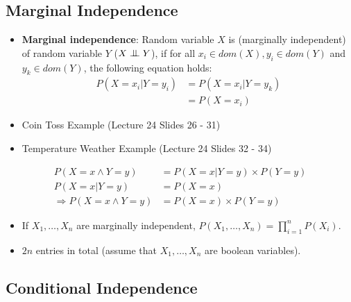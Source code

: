 \documentclass{article}
\newcommand{\bigCI}{\mathrel{\text{\scalebox{1.07}{$\perp\mkern-10mu\perp$}}}}
\begin{document}
\subsection{Marginal Independence}

\begin{itemize}
    \item \textbf{Marginal independence}: Random variable $X$ is (marginally independent) of random variable $Y$ ($X \bigCI Y$), if for all $x_i \in dom(X), y_i \in dom(Y)$ and $y_k \in dom(Y)$, the following equation holds:
    \begin{align*}
        P(X = x_i|Y = y_i) &=  P(X = x_i|Y = y_k) \\
        &= P(X = x_i)
    \end{align*}
    \item Coin Toss Example (Lecture 24 Slides 26 - 31)
    \item Temperature Weather Example (Lecture 24 Slides 32 - 34)
\end{itemize}

\begin{align*}
    P(X = x \wedge Y = y) &= P(X = x | Y = y) \times P(Y = y) \tag{Product Rule}\\
    P(X = x | Y = y) &= P(X = x) \tag{$X$ \& $Y$ are marginally independent}\\
    \Rightarrow P(X = x \wedge Y = y) &= P(X = x) \times P(Y = y)
\end{align*}

\begin{itemize}
    \item If $X_1, \ldots, X_n$ are marginally independent, $P(X_1, \ldots, X_n) = \prod\limits_{i = 1}^{n} P(X_i)$.
    \item $2n$ entries in total (assume that $X_1, \ldots, X_n$ are boolean variables).
\end{itemize}

\subsection{Conditional Independence}
\end{document}
